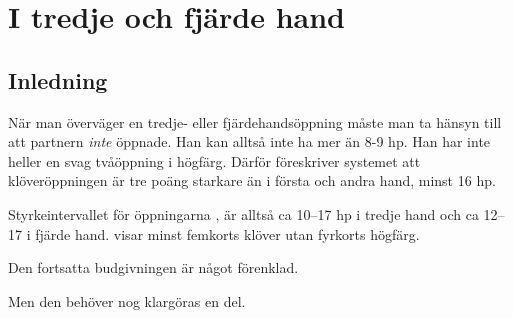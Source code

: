 \chapter{I tredje och fjärde hand}

\section{Inledning}

När man överväger en tredje- eller fjärdehandsöppning måste man ta
hänsyn till att partnern {\em inte} öppnade. Han kan alltså inte ha
mer än 8-9 hp. Han har inte heller
en svag tvåöppning i högfärg. Därför föreskriver 
systemet att klöveröppningen är tre poäng starkare än  i första och andra
hand, minst 16 hp. 

Styrkeintervallet för öppningarna ,  är alltså
ca 10--17 hp i tredje hand och ca 12--17 i fjärde hand.  visar minst
femkorts klöver utan fyrkorts högfärg.   

Den fortsatta budgivningen är något förenklad.

Men den behöver nog klargöras en del.
